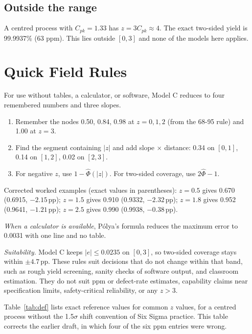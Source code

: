 \documentclass[10pt,a4paper]{article}
\newcommand{\Phihat}{\hat{\Phi}}
\newcommand{\pp}{\,\textup{pp}}
\begin{document}
\subsection{Outside the range}

A centred process with $C_{pk} = 1.33$ has $z = 3C_{pk} \approx 4$. The exact two-sided yield is 99.9937\% (63 ppm). This lies outside $[0,3]$ and none of the models here applies.

\section{Quick Field Rules}

For use without tables, a calculator, or software, Model C reduces to four remembered numbers and three slopes.

\begin{enumerate}[leftmargin=1.6em,itemsep=2pt]
\item Remember the nodes 0.50, 0.84, 0.98 at $z = 0, 1, 2$ (from the 68-95 rule) and 1.00 at $z = 3$.
\item Find the segment containing $|z|$ and add slope $\times$ distance: 0.34 on $[0,1]$, 0.14 on $[1,2]$, 0.02 on $[2,3]$.
\item For negative $z$, use $1 - \Phihat(|z|)$. For two-sided coverage, use $2\Phihat - 1$.
\end{enumerate}

Corrected worked examples (exact values in parentheses): $z=0.5$ gives 0.670 (0.6915, $-2.15$\pp); $z=1.5$ gives 0.910 (0.9332, $-2.32$\pp); $z=1.8$ gives 0.952 (0.9641, $-1.21$\pp); $z=2.5$ gives 0.990 (0.9938, $-0.38$\pp).

\textit{When a calculator is available}, P\'olya's formula reduces the maximum error to 0.0031 with one line and no table.

\textit{Suitability.} Model C keeps $|e| \le 0.0235$ on $[0,3]$, so two-sided coverage stays within $\pm4.7$\pp. These rules suit decisions that do not change within that band, such as rough yield screening, sanity checks of software output, and classroom estimation. They do not suit ppm or defect-rate estimates, capability claims near specification limits, safety-critical reliability, or any $z > 3$.

Table~\ref{tab:def} lists exact reference values for common $z$ values, for a centred process without the 1.5$\sigma$ shift convention of Six Sigma practice. This table corrects the earlier draft, in which four of the six ppm entries were wrong.
\end{document}
